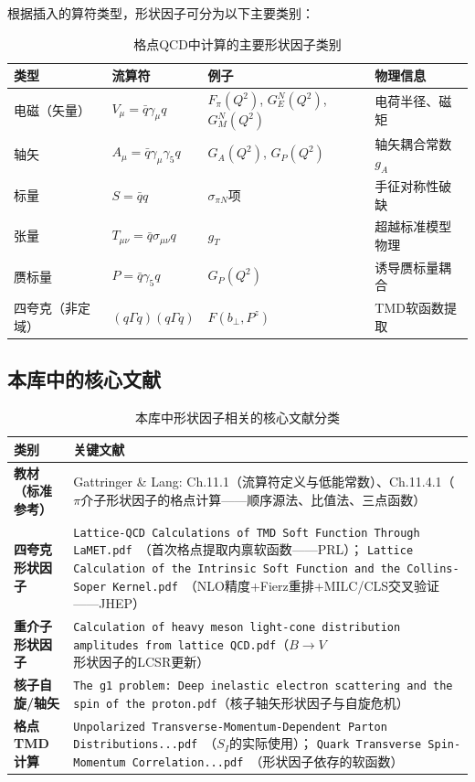 \documentclass[12pt,a4paper]{ctexart}
\theoremstyle{definition}
\begin{document}
根据插入的算符类型，形状因子可分为以下主要类别：

\begin{table}[H]
\centering
\caption{格点QCD中计算的主要形状因子类别}
\label{tab:ff_types}
\small
\begin{tabular}{p{2.5cm}p{2.5cm}p{2.5cm}p{5.5cm}}
\toprule
\textbf{类型} & \textbf{流算符} & \textbf{例子} & \textbf{物理信息} \\
\midrule
电磁（矢量） & $V_\mu = \bar q \gamma_\mu q$ & $F_\pi(Q^2)$, $G_E^N(Q^2)$, $G_M^N(Q^2)$ & 电荷半径、磁矩 \\
轴矢 & $A_\mu = \bar q \gamma_\mu\gamma_5 q$ & $G_A(Q^2)$, $G_P(Q^2)$ & 轴矢耦合常数$g_A$ \\
标量 & $S = \bar q q$ & $\sigma_{\pi N}$项 & 手征对称性破缺 \\
张量 & $T_{\mu\nu} = \bar q \sigma_{\mu\nu} q$ & $g_T$ & 超越标准模型物理 \\
赝标量 & $P = \bar q \gamma_5 q$ & $G_P(Q^2)$ & 诱导赝标量耦合 \\
四夸克（非定域） & $(q\Gamma q)(q\Gamma q)$ & $F(b_\perp, P^z)$ & TMD软函数提取 \\
\bottomrule
\end{tabular}
\end{table}

\subsection{本库中的核心文献}

\begin{table}[H]
\centering
\caption{本库中形状因子相关的核心文献分类}
\label{tab:ff_papers}
\small
\begin{tabular}{lp{9cm}}
\toprule
类别 & 关键文献 \\
\midrule
\textbf{教材（标准参考）} &
Gattringer \& Lang: Ch.11.1（流算符定义与低能常数）、Ch.11.4.1（$\pi$介子形状因子的格点计算——顺序源法、比值法、三点函数）\\
\textbf{四夸克形状因子} &
\texttt{Lattice-QCD Calculations of TMD Soft Function Through LaMET.pdf}~\cite{LPC2020soft}（首次格点提取内禀软函数——PRL）；
\texttt{Lattice Calculation of the Intrinsic Soft Function and the Collins-Soper Kernel.pdf}~\cite{Chu2023soft}（NLO精度+Fierz重排+MILC/CLS交叉验证——JHEP）\\
\textbf{重介子形状因子} &
\texttt{Calculation of heavy meson light-cone distribution amplitudes from lattice QCD.pdf}（$B\to V$形状因子的LCSR更新）\\
\textbf{核子自旋/轴矢} &
\texttt{The g1 problem: Deep inelastic electron scattering and the spin of the proton.pdf}（核子轴矢形状因子与自旋危机）\\
\textbf{格点TMD计算} &
\texttt{Unpolarized Transverse-Momentum-Dependent Parton Distributions...pdf}~\cite{He2024unpolTMD}（$S_I$的实际使用）；
\texttt{Quark Transverse Spin-Momentum Correlation...pdf}~\cite{Ma2025BoerMulders}（形状因子依存的软函数）\\
\bottomrule
\end{tabular}
\end{table}
\end{document}
